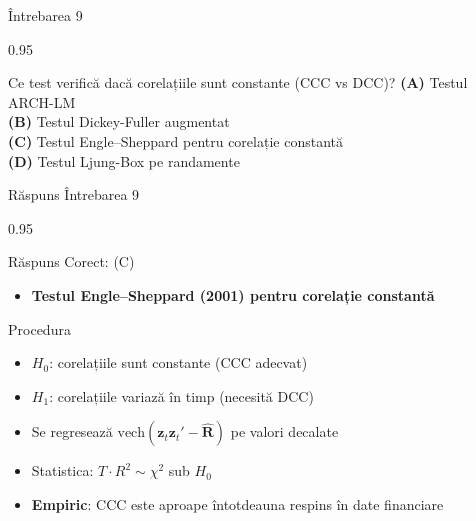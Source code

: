 \documentclass[9pt, aspectratio=169, t]{beamer}
\begin{document}
\begin{frame}{Întrebarea 9}
    \begin{cminipage}{0.95\textwidth}
    \begin{block}{Ce test verifică dacă corelațiile sunt constante (CCC vs DCC)?}
        \textcolor{MainBlue}{\textbf{(A)}} Testul ARCH-LM\\[3pt]
        \textcolor{MainBlue}{\textbf{(B)}} Testul Dickey-Fuller augmentat\\[3pt]
        \textcolor{MainBlue}{\textbf{(C)}} Testul Engle--Sheppard pentru corelație constantă\\[3pt]
        \textcolor{MainBlue}{\textbf{(D)}} Testul Ljung-Box pe randamente
    \end{block}
    \end{cminipage}
\end{frame}

\begin{frame}{Răspuns Întrebarea 9}
    \begin{cminipage}{0.95\textwidth}
    \begin{exampleblock}{Răspuns Corect: (C)}
        \begin{itemize}\setlength{\itemsep}{0pt}
            \item \textbf{Testul Engle--Sheppard (2001) pentru corelație constantă}
        \end{itemize}
    \end{exampleblock}

    \pause
    \begin{block}{Procedura}
        \begin{itemize}\setlength{\itemsep}{0pt}
            \item $H_0$: corelațiile sunt constante (CCC adecvat)
            \item $H_1$: corelațiile variază în timp (necesită DCC)
            \item Se regresează $\text{vech}(\mathbf{z}_t\mathbf{z}_t' - \hat{\mathbf{R}})$ pe valori decalate
            \item Statistica: $T \cdot R^2 \sim \chi^2$ sub $H_0$
            \item \textbf{Empiric}: CCC este aproape întotdeauna respins în date financiare
        \end{itemize}
    \end{block}
    \end{cminipage}
\end{frame}
\end{document}
